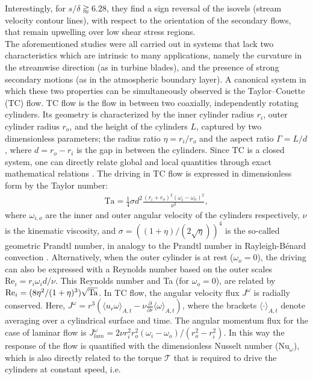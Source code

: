 Interestingly, for $s/\delta \gtrapprox 6.28$, they find a sign reversal of the isovels (stream velocity contour lines), with respect to the orientation of the secondary flows, that remain upwelling over low shear stress regions.\\ 
\indent The aforementioned studies were all carried out in systems that lack two characteristics which are intrinsic to many applications, namely the curvature in the streamwise direction (as in turbine blades), and the presence of strong secondary motions (as in the atmospheric boundary layer). A canonical system in which these two properties can be simultaneously observed is the Taylor--Couette (TC) flow.
TC flow is the flow in between two coaxially, independently rotating cylinders. Its geometry is characterized by the inner cylinder radius $r_{i}$, outer cylinder radius $r_o$, and the height of the cylinders $L$, captured by two dimensionless parameters; the radius ratio $\eta=r_i/r_o$ and the aspect ratio $\Gamma=L/d$, where $d=r_o-r_i$ is the gap in between the cylinders. 
Since TC is a closed system, one can directly relate global and local quantities through exact mathematical relations \citep{Eckhardt2007}. The driving in TC flow is expressed in dimensionless form by the Taylor number: 
%
\begin{align}\label{eq:Ta}
    \text{Ta} = \frac 14 \sigma d^2 \frac{(r_i+r_o)^2(\omega_i-\omega_o)^2}{\nu^2},
\end{align}
%
where $\omega_{i,o}$ are the inner and outer angular velocity of the cylinders respectively, $\nu$ is the kinematic viscosity, and $\sigma=\left(\left(1+\eta\right)/\left(2\sqrt{\eta}\right)\right)^4$ is the so-called geometric Prandtl number, in analogy to the Prandtl number in Rayleigh-B\'{enard} convection \citep{Eckhardt2007}. Alternatively, when the outer cylinder is at rest ($\omega_o=0$), the driving can also be expressed with a Reynolds number based on the outer scales $\text{Re}_i=r_i \omega_i d / \nu$. This Reynolds number and Ta (for $\omega_o=0$), are related by $\text{Re}_i = (8 \eta^2/(1 + \eta)^3) \sqrt{\text{Ta}}$.
In TC flow, the angular velocity flux $J^\omega$ is radially conserved. Here, $J^\omega = r^3 (\langle u_r \omega \rangle_{A,t} - \nu  \frac{\partial}{\partial r} \langle \omega \rangle _{A,t})$, where the brackets $\langle \cdot \rangle _{A,t}$ denote averaging over a cylindrical surface and time. The angular momentum flux for the case of laminar flow is $J_{lam}^\omega = 2\nu r_i^2 r_o^2 (\omega_i-\omega_o) /(r_o^2 - r_i^2)$. In this way the response of the flow is  quantified with the dimensionless Nusselt number ($\text{Nu}_{\omega}$), which is also directly related to the torque $\mathcal{T}$ that is required to drive the cylinders at constant speed, i.e.
